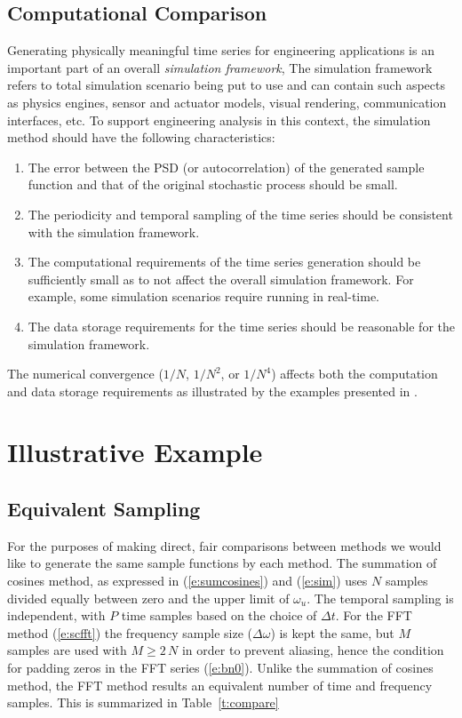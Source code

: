 \documentclass[11pt]{article}
\begin{document}
\subsection{Computational Comparison}

Generating physically meaningful time series for engineering applications is an important part of an overall \emph{simulation framework},  The simulation framework refers to total simulation scenario being put to use and can contain such aspects as physics engines, sensor and actuator models, visual rendering, communication interfaces, etc.  To support engineering analysis in this context, the simulation method should have the following characteristics:
\begin{enumerate}
\item The error between the PSD (or autocorrelation) of the generated sample function and that of the original stochastic process should be small.
\item The periodicity and temporal sampling of the time series should be consistent with the simulation framework.
\item The computational requirements of the time series generation should be sufficiently small as to not affect the overall simulation framework.  For example, some simulation scenarios require running in real-time.
\item The data storage requirements for the time series should be reasonable for the simulation framework.
\end{enumerate}

The numerical convergence ($1/N$, $1/N^2$, or $1/N^4$) affects both the computation and data storage requirements as illustrated by the examples presented in \cite{hu97simulation}.

\section{Illustrative Example}

\subsection{Equivalent Sampling}

For the purposes of making direct, fair comparisons between methods we would like to generate the same sample functions by each method.  The summation of cosines method, as expressed in (\ref{e:sumcosines}) and (\ref{e:sim}) uses $N$ samples divided equally between zero and the upper limit of $\omega_u$.  The temporal sampling is independent, with $P$ time samples based on the choice of $\Delta t$.  For the FFT method (\ref{e:scfft}) the frequency sample size ($\Delta \omega$) is kept the same, but $M$ samples are used with $M\geq 2 \, N$ in order to prevent aliasing, hence the condition for padding zeros in the FFT series (\ref{e:bn0}).  Unlike the summation of cosines method, the FFT method results an equivalent number of time and frequency samples.  This is summarized in Table~\ref{t:compare}
\end{document}

